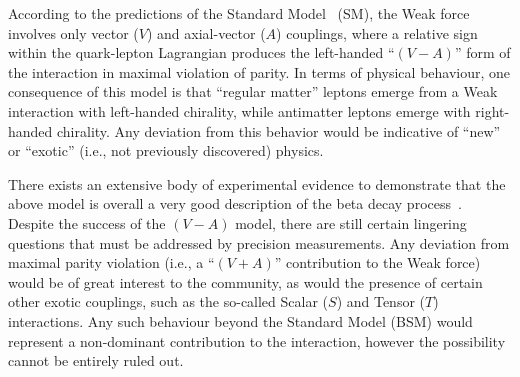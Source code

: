 According to the predictions of the Standard Model~ (SM), the Weak force involves only vector ($V$) and axial-vector ($A$) couplings, where a relative sign within the quark-lepton Lagrangian produces the left-handed ``$(V-A)$'' form of the interaction in maximal violation of parity.  In terms of physical behaviour, one consequence of this model is that ``regular matter'' leptons emerge from a Weak interaction with left-handed chirality, while antimatter leptons emerge with right-handed chirality. Any deviation from this behavior would be indicative of ``new'' or ``exotic'' (i.e., not previously discovered) physics.
~

There exists an extensive body of experimental evidence to demonstrate that the above model is overall a very good description of the beta decay process~\cite{wu}.  Despite the success of the $(V-A)$ model, there are still certain lingering questions that must be addressed by precision measurements.  Any deviation from maximal parity violation (i.e., a ``$(V+A)$'' contribution to the Weak force) would be of great interest to the community, as would the presence of certain other exotic couplings, such as the so-called Scalar ($S$) and Tensor ($T$) interactions.  Any such behaviour beyond the Standard Model (BSM) would represent a non-dominant contribution to the interaction, however the possibility cannot be entirely ruled out.  
~

